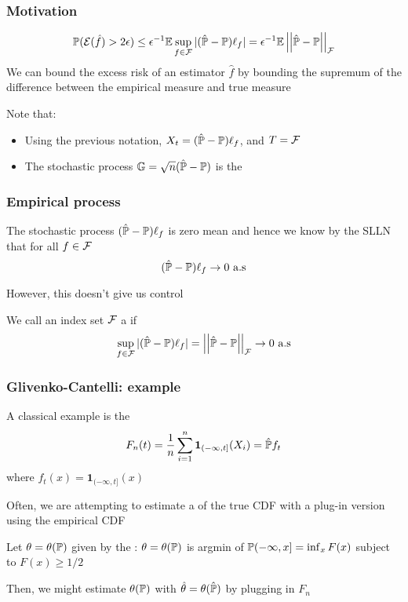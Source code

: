 \documentclass[12pt]{beamer}
\begin{document}
\begin{frame}[fragile]
\frametitle{Motivation}
\[
\P(\mathcal{E}(\hat f) > 2\epsilon )    \leq
\epsilon^{-1}\E \sup_{f \in \F} |(\hat\P - \P)\ell_f|
=
\epsilon^{-1}\E \norm{\hat\P - \P}_\F
\]
We can bound the excess risk of an estimator $\hat f$ by bounding the supremum of the difference between
the empirical measure and true measure

\vsp
Note that:
\begin{itemize}
\item Using the previous notation, $X_t = (\hat \P - \P)\ell_f$, and $T = \F$

\item The stochastic process $\mathbb{G} = \sqrt{n}(\hat \P - \P)$ is the 
\end{itemize}
\end{frame}

\begin{frame}[fragile]
\frametitle{Empirical process}
The stochastic process $(\hat \P - \P)\ell_f$ is zero mean and hence we know by the SLLN that for all $f \in \F$
\[
(\hat \P - \P)\ell_f \rightarrow 0 \textrm{ a.s}
\]

\vsp
However, this doesn't give us  control


\vsp
We call an index set $\F$ a  if
\[
\sup_{f \in \F} |( \hat \P - \P)\ell_f| = \norm{\hat\P - \P}_\F \rightarrow 0 \textrm{ a.s}
\]

\end{frame}

\begin{frame}[fragile]
\frametitle{Glivenko-Cantelli: example}
A classical example is the 
\[
F_n(t) = \frac{1}{n} \sum_{i=1}^n \mathbf{1}_{(-\infty,t]}(X_i) = \hat\P f_t
\]
where $f_t(x) = \mathbf{1}_{(-\infty,t]}(x)$

\vsp
Often, we are attempting to estimate a  of the true CDF with a plug-in version using the 
empirical CDF


\vsp
{} Let $\theta = \theta(\P)$ given by the :
$\theta = \theta(\P)$ is argmin of $\P(-\infty,x] = \inf_x F(x)$ subject to $F(x) \geq 1/2$
\vsp

Then, we might estimate $\theta(\P)$ with 
$\hat\theta = \theta(\hat\P)$ by plugging in $F_n$
\end{frame}
\end{document}
